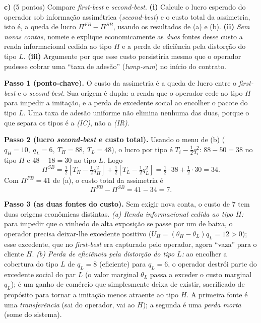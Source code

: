 \textbf{c)} (5 pontos) Compare \emph{first-best} e \emph{second-best}. \textbf{(i)} Calcule o lucro esperado do operador sob informa\c{c}\~ao assim\'etrica (\emph{second-best}) e o custo total da assimetria, isto \'e, a queda de lucro $\Pi^{FB} - \Pi^{SB}$, usando os resultados de (a) e (b). \textbf{(ii)} \emph{Sem novas contas}, nomeie e explique economicamente as \emph{duas} fontes desse custo \textemdash{} a renda informacional cedida ao tipo $H$ e a perda de efici\^encia pela distor\c{c}\~ao do tipo $L$. \textbf{(iii)} Argumente por que esse custo persistiria mesmo que o operador pudesse cobrar uma ``taxa de ades\~ao'' (\emph{lump-sum}) no in\'icio do contrato.
\resolucaobox{7.2cm}
\begin{solucao}
\textbf{Passo 1 (ponto-chave).} O custo da assimetria \'e a queda de lucro entre o \emph{first-best} e o \emph{second-best}. Sua origem \'e dupla: a renda que o operador cede ao tipo $H$ para impedir a imita\c{c}\~ao, e a perda de excedente social ao encolher o pacote do tipo $L$. Uma taxa de ades\~ao uniforme n\~ao elimina nenhuma das duas, porque o que separa os tipos \'e a \emph{(IC)}, n\~ao a \emph{(IR)}.

\textbf{Passo 2 (lucro \emph{second-best} e custo total).} Usando o menu de (b) ($q_H = 10,\ q_L = 6,\ T_H = 88,\ T_L = 48$), o lucro por tipo \'e $T_i - \tfrac{1}{2}q_i^{2}$: $88 - 50 = 38$ no tipo $H$ e $48 - 18 = 30$ no tipo $L$. Logo
\[
\Pi^{SB} = \tfrac{1}{2}\!\left[T_H - \tfrac{1}{2}q_H^{2}\right] + \tfrac{1}{2}\!\left[T_L - \tfrac{1}{2}q_L^{2}\right] = \tfrac{1}{2}\cdot 38 + \tfrac{1}{2}\cdot 30 = 34.
\]
Com $\Pi^{FB} = 41$ de (a), o custo total da assimetria \'e
\[
\Pi^{FB} - \Pi^{SB} = 41 - 34 = 7.
\]

\textbf{Passo 3 (as duas fontes do custo).} Sem exigir nova conta, o custo de $7$ tem duas origens econ\^omicas distintas. \emph{(a) Renda informacional cedida ao tipo $H$:} para impedir que o vinhedo de alta exposi\c{c}\~ao se passe por um de baixa, o operador precisa deixar-lhe excedente positivo ($U_H = (\theta_H - \theta_L)q_L = 12 > 0$); esse excedente, que no \emph{first-best} era capturado pelo operador, agora ``vaza'' para o cliente $H$. \emph{(b) Perda de efici\^encia pela distor\c{c}\~ao do tipo $L$:} ao encolher a cobertura do tipo $L$ de $q_L = 8$ (eficiente) para $q_L = 6$, o operador destr\'oi parte do excedente social do par $L$ (o valor marginal $\theta_L$ passa a exceder o custo marginal $q_L$); \'e um ganho de com\'ercio que simplesmente deixa de existir, sacrificado de prop\'osito para tornar a imita\c{c}\~ao menos atraente ao tipo $H$. A primeira fonte \'e uma \emph{transfer\^encia} (sai do operador, vai ao $H$); a segunda \'e uma \emph{perda morta} (some do sistema).


\end{solucao}
